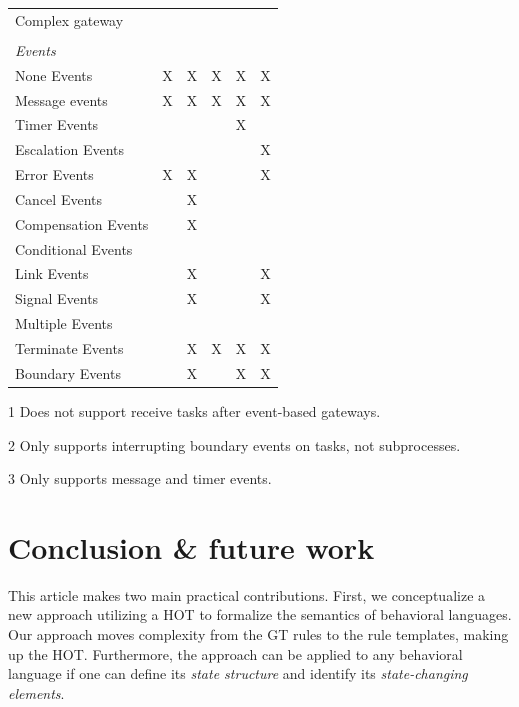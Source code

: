 \documentclass{lmcs} %
\begin{document}
\begin{table}[htbp]
\begin{threeparttable}
\begin{tabular}{l l l l l l}
      Complex gateway & & & & &\\
      \\
      \textit{Events} \\
      None Events & X & X & X & X & X\\
      Message events & X & X & X & X & X\\
      Timer Events & & & & X & \\
      Escalation Events & & & & & X\\
      Error Events & X & X & & & X\\
      Cancel Events & & X & & &\\
      Compensation Events & & X & & &\\
      Conditional Events & & & & &\\
      Link Events & & X & & & X\\
      Signal Events & & X & & & X\\
      Multiple Events & &  & & & \\
      Terminate Events & & X & X & X & X\\
      Boundary Events & & X\tnote{2} & & X\tnote{3} & X\\ %
    \end{tabular}
    \begin{tablenotes}
        \item[1] Does not support receive tasks after event-based gateways.
        \item[2] Only supports interrupting boundary events on tasks, not subprocesses.
        \item[3] Only supports message and timer events.
    \end{tablenotes}
    \end{threeparttable}
\end{table}


\section{Conclusion \& future work} \label{sec:conclusion}
This article makes two main practical contributions.
First, we conceptualize a new approach utilizing a HOT to formalize the semantics of behavioral languages.
Our approach moves complexity from the GT rules to the rule templates, making up the HOT.
Furthermore, the approach can be applied to any behavioral language if one can define its \textit{state structure} and identify its \textit{state-changing elements}.
\end{document}
